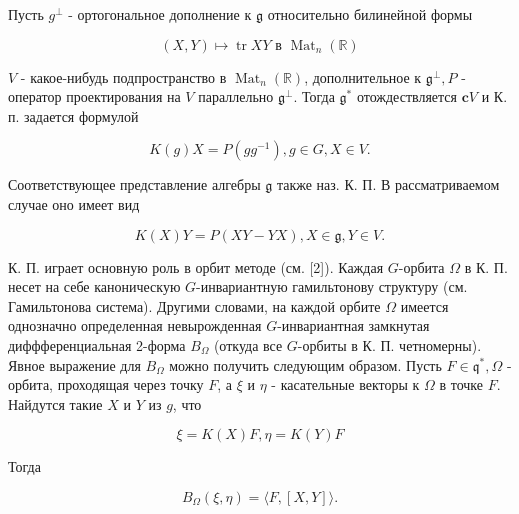 \documentclass[10pt]{article}
\begin{document}
Пусть $g^{\perp}$ - ортогональное дополнение к $\mathfrak{g}$ относительно билинейной формы



\[

(X, Y) \longmapsto \operatorname{tr} X Y \text { в } \operatorname{Mat}_{n}(\mathbb{R})

\]



$V$ - какое-нибудь подпространство в $\operatorname{Mat}_{n}(\mathbb{R})$, дополнительное к $\mathfrak{g}^{\perp}, P$ - оператор проектирования на $V$ параллельно $\mathfrak{g}^{\perp}$. Тогда $\mathfrak{g}^{*}$ отождествляется $\boldsymbol{c} V$ и К. п. задается формулой



\[

K(g) X=P\left(g g^{-1}\right), g \in G, X \in V .

\]



Соответствующее представление алгебры $\mathfrak{g}$ также наз. К. П. В рассматриваемом случае оно имеет вид



\[

K(X) Y=P(X Y-Y X), X \in \mathfrak{g}, Y \in V .

\]



К. П. играет основную роль в орбит методе (см. [2]). Каждая $G$-орбита $\Omega$ в К. П. несет на себе каноническую $G$-инвариантную гамильтонову структуру (см. Гамильтонова система). Другими словами, на каждой орбите $\Omega$ имеется однозначно определенная невырожденная $G$-инвариантная замкнутая диффференциальная 2-форма $B_{\Omega}$ (откуда все $G$-орбиты в К. П. четномерны). Явное выражение для $B_{\Omega}$ можно получить следующим образом. Пусть $F \in \mathfrak{q}^{*}, \Omega$ - орбита, проходящая через точку $F$, а $\xi$ и $\eta$ - касательные векторы к $\Omega$ в точке $F$. Найдутся такие $X$ и $Y$ из $g$, что



\[

\xi=K(X) F, \eta=K(Y) F

\]



Тогда



\[

B_{\Omega}(\xi, \eta)=\langle F,[X, Y]\rangle .

\]
\end{document}
